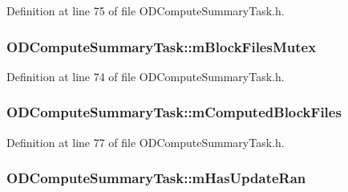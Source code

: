 Definition at line 75 of file O\+D\+Compute\+Summary\+Task.\+h.

\subsubsection[{\texorpdfstring{m\+Block\+Files\+Mutex}{mBlockFilesMutex}}]{ O\+D\+Compute\+Summary\+Task\+::m\+Block\+Files\+Mutex\hspace{0.3cm}{\ttfamily [protected]}}\hypertarget{class_o_d_compute_summary_task_a559f0f89aadfdaa0b5e16177d3f888bd}{}\label{class_o_d_compute_summary_task_a559f0f89aadfdaa0b5e16177d3f888bd}


Definition at line 74 of file O\+D\+Compute\+Summary\+Task.\+h.

\subsubsection[{\texorpdfstring{m\+Computed\+Block\+Files}{mComputedBlockFiles}}]{ O\+D\+Compute\+Summary\+Task\+::m\+Computed\+Block\+Files\hspace{0.3cm}{\ttfamily [protected]}}\hypertarget{class_o_d_compute_summary_task_a46a4ba6dbbcf45d41488ce3a7c992444}{}\label{class_o_d_compute_summary_task_a46a4ba6dbbcf45d41488ce3a7c992444}


Definition at line 77 of file O\+D\+Compute\+Summary\+Task.\+h.

\subsubsection[{\texorpdfstring{m\+Has\+Update\+Ran}{mHasUpdateRan}}]{ O\+D\+Compute\+Summary\+Task\+::m\+Has\+Update\+Ran\hspace{0.3cm}{\ttfamily [protected]}}\hypertarget{class_o_d_compute_summary_task_a6c1b4d0272f909d4b1c7e04e9ab73fe3}{}\label{class_o_d_compute_summary_task_a6c1b4d0272f909d4b1c7e04e9ab73fe3}


